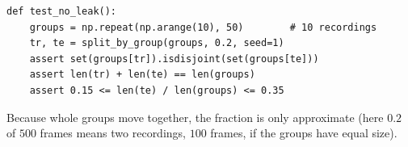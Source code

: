 \begin{enumerate}[label=\textbf{\ansnum.\arabic*}]
\begin{verbatim}
def test_no_leak():
    groups = np.repeat(np.arange(10), 50)        # 10 recordings
    tr, te = split_by_group(groups, 0.2, seed=1)
    assert set(groups[tr]).isdisjoint(set(groups[te]))
    assert len(tr) + len(te) == len(groups)
    assert 0.15 <= len(te) / len(groups) <= 0.35
\end{verbatim}
  Because whole groups move together, the fraction is only approximate (here $0.2$ of $500$ frames means two recordings, $100$ frames, if the groups have equal size).
\end{enumerate}
